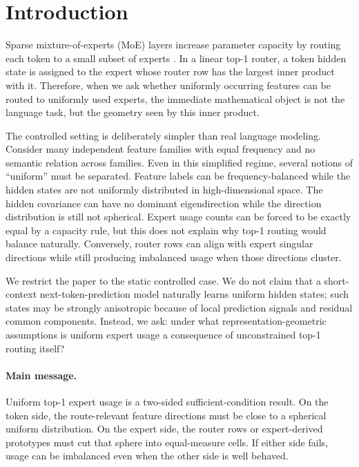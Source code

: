 \section{Introduction}

Sparse mixture-of-experts (MoE) layers increase parameter capacity by routing
each token to a small subset of experts \citep{shazeer2017outrageously,
fedus2022switch}. In a linear top-1 router, a token hidden state is assigned to
the expert whose router row has the largest inner product with it. Therefore,
when we ask whether uniformly occurring features can be routed to uniformly used
experts, the immediate mathematical object is not the language task, but the
geometry seen by this inner product.

The controlled setting is deliberately simpler than real language modeling.
Consider many independent feature families with equal frequency and no semantic
relation across families. Even in this simplified regime, several notions of
``uniform'' must be separated. Feature labels can be frequency-balanced while
the hidden states are not uniformly distributed in high-dimensional space. The
hidden covariance can have no dominant eigendirection while the direction
distribution is still not spherical. Expert usage counts can be forced to be
exactly equal by a capacity rule, but this does not explain why top-1 routing
would balance naturally. Conversely, router rows can align with expert singular
directions while still producing imbalanced usage when those directions cluster.

We restrict the paper to the static controlled case. We do not claim that a
short-context next-token-prediction model naturally learns uniform hidden
states; such states may be strongly anisotropic because of local prediction
signals and residual common components. Instead, we ask: under what
representation-geometric assumptions is uniform expert usage a consequence of
unconstrained top-1 routing itself?

\paragraph{Main message.}
Uniform top-1 expert usage is a two-sided sufficient-condition result. On the
token side, the route-relevant feature directions must be close to a spherical
uniform distribution. On the expert side, the router rows or expert-derived
prototypes must cut that sphere into equal-measure cells. If either side fails,
usage can be imbalanced even when the other side is well behaved.


